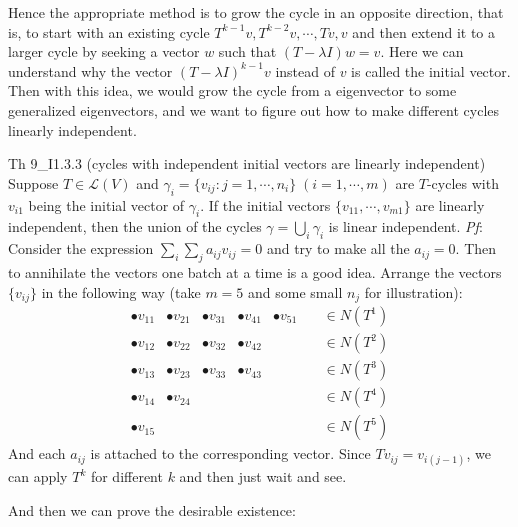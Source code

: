 \documentclass{article}
\begin{document}
Hence the appropriate method is to grow the cycle in an opposite direction, that is, to start with an existing cycle $T^{k-1}v, T^{k-2}v, \cdots, Tv, v$ and then extend it to a larger cycle by seeking a vector $w$ such that $(T-\lambda I)w = v$. Here we can understand why the vector $(T-\lambda I)^{k-1}v$ instead of $v$ is called the initial vector. Then with this idea, we would grow the cycle from a eigenvector to some generalized eigenvectors, and we want to figure out how to make different cycles linearly independent.

\begin{Th}{Th 9\_I1.3.3 (cycles with independent initial vectors are linearly independent)}
    Suppose $T\in\mathcal{L}(V)$ and $\gamma_i = \{v_{ij}: j=1,\cdots,n_i\}\; (i=1,\cdots,m)$ are $T$-cycles with $v_{i1}$ being the initial vector of $\gamma_i$. If the initial vectors $\{v_{11},\cdots, v_{m1}\}$ are linearly independent, then the union of the cycles $\gamma = \bigcup_i \gamma_i$ is linear independent.
    \tcblower
    \textit{Pf}: Consider the expression $\sum_{i}\sum_{j} a_{ij}v_{ij} = 0$ and try to make all the $a_{ij}=0$. Then to annihilate the vectors one batch at a time is a good idea. Arrange the vectors $\{v_{ij}\}$ in the following way (take $m=5$ and some small $n_j$ for illustration):
    $$
    \begin{aligned}
        \bullet v_{11} & \bullet v_{21} & \bullet v_{31} & \bullet v_{41} & \bullet v_{51} & \quad\in N(T^1)\\
        \bullet v_{12} & \bullet v_{22} & \bullet v_{32} & \bullet v_{42} & &\quad\in N(T^2)\\
        \bullet v_{13} & \bullet v_{23} & \bullet v_{33} & \bullet v_{43} & &\quad\in N(T^3)\\
        \bullet v_{14} & \bullet v_{24} & & & &\quad\in N(T^4)\\
        \bullet v_{15} & & & & & \quad\in N(T^5)
    \end{aligned}
    $$
    And each $a_{ij}$ is attached to the corresponding vector. Since $Tv_{ij} = v_{i(j-1)}$, we can apply $T^{k}$ for different $k$ and then just wait and see.
\end{Th}

And then we can prove the desirable existence:
\end{document}
